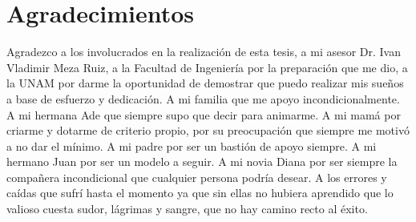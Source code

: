 	\chapter*{Agradecimientos}
	\justify Agradezco a los involucrados en la realización de esta tesis, a mi asesor Dr. Ivan Vladimir Meza Ruiz, a la Facultad de Ingeniería por la preparación que me dio, a la UNAM por darme la oportunidad de demostrar que puedo realizar mis sueños a base de esfuerzo y dedicación. A mi familia que me apoyo incondicionalmente. A mi hermana Ade que siempre supo que decir para animarme. A mi mamá por criarme y dotarme de criterio propio, por su preocupación que siempre me motivó a no dar el mínimo. A mi padre por ser un bastión de apoyo siempre. A mi hermano Juan por ser un modelo a seguir. A mi novia Diana por ser siempre la compañera incondicional que cualquier persona podría desear. A los errores y caídas que sufrí hasta el momento ya que sin ellas no hubiera aprendido que lo valioso cuesta sudor, lágrimas y sangre, que no hay camino recto al éxito. 